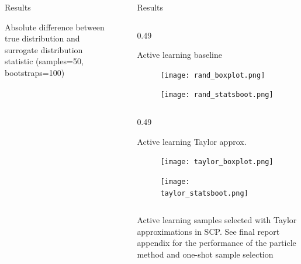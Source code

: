 \documentclass[final]{beamer}
\newlength{\sepwidth}
\newlength{\colwidth}
\newcommand{\separatorcolumn}{\begin{column}{\sepwidth}\end{column}}
\begin{document}
\begin{frame}[t]
\begin{columns}[t]
\begin{column}{\colwidth}
  \vspace*{-30}
  \begin{block}{Results}
    \begin{table}[h]
      \small
      \begin{center}
          \caption{\label{fig:summ} Absolute difference between true distribution and surrogate distribution statistic (samples=50, bootstraps=100)}
          
      \end{center}
      \end{table}
    \end{block}


\end{column}

\separatorcolumn

\begin{column}{\colwidth}
  \vspace*{-10}
  \begin{block}{Results}

    \begin{column}{0.49\colwidth} 
      \vspace*{-20}
      \begin{block}{Active learning baseline}
      \begin{figure}[h]
          \centering
          \texttt{[image: rand\_boxplot.png]}
      \end{figure}
      \begin{figure}[h]
        \centering
        \texttt{[image: rand\_statsboot.png]}
    \end{figure}
  \end{block}
      \end{column}
      \begin{column}{0.49\colwidth} 
        \vspace*{-20}
        \begin{block}{Active learning Taylor approx.}
      \begin{figure}[h]
          \centering
          \texttt{[image: taylor\_boxplot.png]}
      \end{figure}
      \begin{figure}[h]
        \centering
        \texttt{[image: taylor\_statsboot.png]}
    \end{figure}
  \end{block}
      \end{column}
      \footnotesize{Active learning samples selected with Taylor approximations in SCP. See final report appendix for the performance of the particle method and one-shot sample selection}


\end{block}
\end{column}
\end{columns}
\end{frame}
\end{document}
